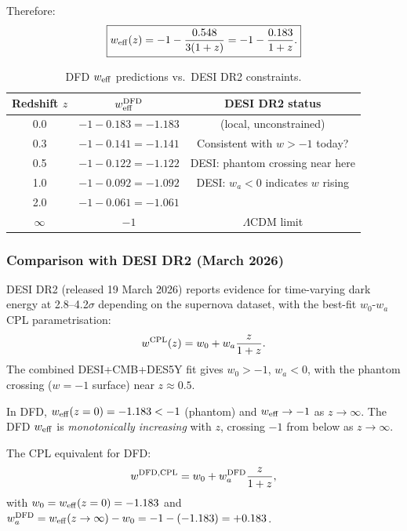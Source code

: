 \documentclass[11pt]{article}
\theoremstyle{definition}
\theoremstyle{remark}
\begin{document}
Therefore:
\begin{equation}
\boxed{w_{\rm eff}(z) = -1 - \frac{0.548}{3(1+z)} = -1 - \frac{0.183}{1+z}.}
\end{equation}

\begin{table}[h]
\centering
\caption{DFD $w_{\rm eff}$ predictions vs.\ DESI DR2 constraints.}
\begin{tabular}{ccc}
\toprule
Redshift $z$ & $w_{\rm eff}^{\rm DFD}$ & DESI DR2 status \\
\midrule
0.0 & $-1 - 0.183 = -1.183$ & (local, unconstrained) \\
0.3 & $-1 - 0.141 = -1.141$ & Consistent with $w > -1$ today? \\
0.5 & $-1 - 0.122 = -1.122$ & DESI: phantom crossing near here \\
1.0 & $-1 - 0.092 = -1.092$ & DESI: $w_a < 0$ indicates $w$ rising \\
2.0 & $-1 - 0.061 = -1.061$ & \\
$\infty$ & $-1$ & $\Lambda$CDM limit \\
\bottomrule
\end{tabular}
\end{table}

\subsubsection{Comparison with DESI DR2 (March 2026)}

DESI DR2 (released 19 March 2026) reports evidence for time-varying dark energy
at 2.8--4.2$\sigma$ depending on the supernova dataset, with the best-fit
$w_0$-$w_a$ CPL parametrisation:
\begin{equation}
w^{\rm CPL}(z) = w_0 + w_a\frac{z}{1+z}.
\end{equation}
The combined DESI+CMB+DES5Y fit gives $w_0 > -1$, $w_a < 0$, with the
phantom crossing ($w = -1$ surface) near $z \approx 0.5$.

In DFD, $w_{\rm eff}(z=0) = -1.183 < -1$ (phantom) and $w_{\rm eff}
\to -1$ as $z \to \infty$. The DFD $w_{\rm eff}$ is \emph{monotonically
increasing} with $z$, crossing $-1$ from below as $z\to\infty$.

The CPL equivalent for DFD:
\begin{equation}
w^{\rm DFD,CPL} = w_0 + w_a^{\rm DFD}\frac{z}{1+z},
\end{equation}
with $w_0 = w_{\rm eff}(z=0) = -1.183$ and
$w_a^{\rm DFD} = w_{\rm eff}(z\to\infty) - w_0 = -1 - (-1.183) = +0.183$.
\end{document}

